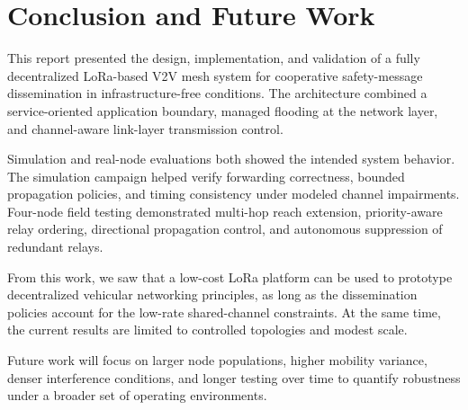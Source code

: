 \chapter{Conclusion and Future Work}

This report presented the design, implementation, and validation of a fully decentralized LoRa-based V2V mesh
system for cooperative safety-message dissemination in infrastructure-free conditions. The architecture
combined a service-oriented application boundary, managed flooding at the network layer, and channel-aware
link-layer transmission control.

Simulation and real-node evaluations both showed the intended system behavior. The simulation campaign helped
verify forwarding correctness, bounded propagation policies, and timing consistency under modeled channel
impairments. Four-node field testing demonstrated multi-hop reach extension, priority-aware relay ordering,
directional propagation control, and autonomous suppression of redundant relays.

From this work, we saw that a low-cost LoRa platform can be used to prototype decentralized vehicular
networking principles, as long as the dissemination policies account for the low-rate shared-channel
constraints. At the same time, the current results are limited to controlled topologies and modest scale.

Future work will focus on larger node populations, higher mobility variance, denser interference conditions,
and longer testing over time to quantify robustness under a broader set of operating environments.
